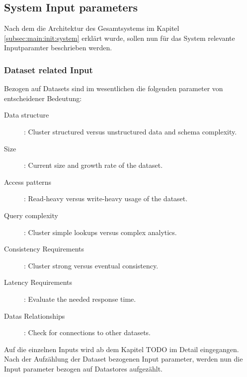 \subsection{System Input parameters}
\label{subsec:main:init:input}
Nach dem die Architektur des Gesamtsystems im Kapitel \ref{subsec:main:init:system} erklärt wurde, sollen nun 
für das System relevante Inputparamter beschrieben werden.

\subsubsection{Dataset related Input}
\label{ssubsec:main:init:input:dataset}

Bezogen auf Datasets sind im wesentlichen die folgenden parameter von entscheidener Bedeutung:
\begin{description}
    \item[Data structure]: Cluster structured versus unstructured data and schema complexity.
    \item[Size]: Current size and growth rate of the dataset.
    \item[Access patterns]: Read-heavy versus write-heavy usage of the dataset.
    \item[Query complexity]: Cluster simple lookups versus complex analytics.
    \item[Consistency Requirements]: Cluster strong versus eventual consistency.
    \item[Latency Requirements]: Evaluate the needed response time.
    \item[Datas Relationships]: Check for connections to other datasets.        
\end{description}
Auf die einzelnen Inputs wird ab dem Kapitel TODO im Detail eingegangen. 
Nach der Aufzählung der Dataset bezogenen Input parameter, werden nun die Input parameter
bezogen auf Datastores aufgezählt.

